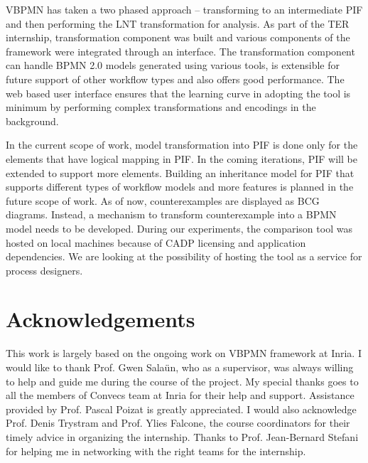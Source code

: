 \documentclass{article}
\begin{document}
VBPMN has taken a two phased approach – transforming to an intermediate PIF and then performing the LNT transformation for analysis. As part of the TER internship, transformation component was built and various components of the framework were integrated through an interface. The transformation component can handle BPMN 2.0 models generated using various tools, is extensible for future support of other workflow types and also offers good performance. The web based user interface ensures that the learning curve in adopting the tool is minimum by performing complex transformations and encodings in the background.  

In the current scope of work, model transformation into PIF is done only for the elements that have logical mapping in PIF. In the coming iterations, PIF will be extended to support more elements. Building an inheritance model for PIF that supports different types of workflow models and more features is planned in the future scope of work. As of now, counterexamples are displayed as BCG diagrams. Instead, a mechanism to transform counterexample into a BPMN model needs to be developed. During our experiments, the comparison tool was hosted on local machines because of CADP licensing and application dependencies. We are looking at the possibility of hosting the tool as a service for process designers. 

\section*{Acknowledgements}

This work is largely based on the ongoing work on VBPMN framework at Inria. I would like to thank Prof. Gwen Sala{\"{u}}n, who as a supervisor, was always willing to help and guide me during the course of the project. My special thanks goes to all the members of Convecs team at Inria for their help and support. Assistance provided by Prof. Pascal Poizat is greatly appreciated. I would also acknowledge Prof. Denis Trystram and Prof. Ylies Falcone, the course coordinators for their timely advice in organizing the internship. Thanks to Prof. Jean-Bernard Stefani for helping me in networking with the right teams for the internship.

\appendix




\end{document}
